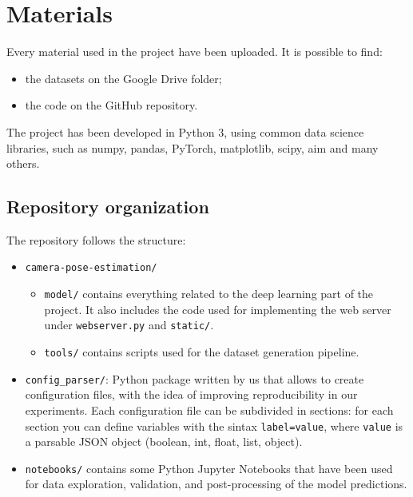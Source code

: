 \section{Materials}
Every material used in the project have been uploaded. It is possible to find:
\begin{itemize}
    \item the datasets on the Google Drive folder;
    \item the code on the GitHub repository.
\end{itemize}

The project has been developed in Python 3, using common data science libraries, such as numpy, pandas, PyTorch, matplotlib, scipy, aim and many others.

\subsection{Repository organization}
The repository follows the structure:
\begin{itemize}
    \item \texttt{camera-pose-estimation/}
    \begin{itemize}
        \item \texttt{model/} contains everything related to the deep learning part of the project. It also includes the code used for implementing the web server under \texttt{webserver.py} and \texttt{static/}.
        \item \texttt{tools/} contains scripts used for the dataset generation pipeline.
    \end{itemize}
    \item \texttt{config\_parser/}: Python package written by us that allows to create configuration files, with the idea of improving reproducibility in our experiments. Each configuration file can be subdivided in sections: for each section you can define variables with the sintax \texttt{label=value}, where \texttt{value} is a parsable JSON object (boolean, int, float, list, object).
    \item \texttt{notebooks/} contains some Python Jupyter Notebooks that have been used for data exploration, validation, and post-processing of the model predictions.
\end{itemize}


